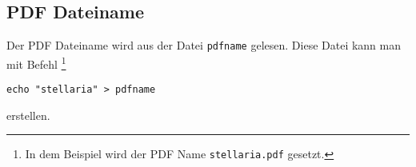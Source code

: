 \subsection{PDF Dateiname}
\label{ssec:pdf_dateiname}

Der PDF Dateiname wird aus der Datei \verb!pdfname!
gelesen. Diese Datei kann man mit Befehl%
\footnote{%
In dem Beispiel wird der PDF Name \texttt{stellaria.pdf} gesetzt.
}

\begin{verbatim}
echo "stellaria" > pdfname
\end{verbatim}

erstellen.






